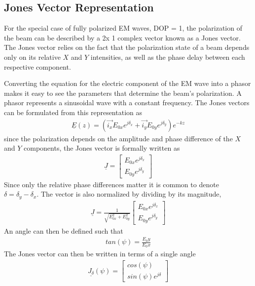 \subsection{Jones Vector Representation}
For the special case of fully polarized EM waves, DOP = 1, the polarization of the beam can be described by a 2x 1 complex vector known as a Jones vector.  The Jones vector relies on the fact that the polarization state of a beam depends only on its relative $X$ and $Y$ intensities, as well as the phase delay between each respective component.

Converting the equation for the electric component of the EM wave into a phasor makes it easy to see the parameters that determine the beam's polarization.  A phasor represents a sinusoidal wave with a constant frequency.  The Jones vectors can be formulated from this representation as
%
\begin{align}
    \underline{\hat{E}}(z)=(\vec{i_x} E_{0x} e^{j\delta_x}+\vec{i_y} E_{0y} e^{j\delta_y })e^{-kz}
\end{align}
%
since the polarization depends on the amplitude and phase difference of the $X$ and $Y$ components, the Jones vector is formally written as
%
\begin{align}
    \underline{J} =
    \begin{bmatrix}
        E_{0x} e^{j\delta_x} \\
        E_{0y} e^{j\delta_y }
    \end{bmatrix}
\end{align}
%
Since only the relative phase differences matter it is common to denote $\delta=\delta_y-\delta_x$.  The vector is also normalized by dividing by its magnitude,
%
\begin{align}
    \underline{J} =
    \frac{1}{\sqrt{E_{0x}^2 + E_{0y}^2}}
    \begin{bmatrix}
        E_{0x} e^{j\delta_x} \\
        E_{0y} e^{j\delta_y }
    \end{bmatrix}
\end{align}
%
An angle can then be defined such that
%
\begin{align}
    tan(\psi) = \frac{E_0y}{E_0x}
\end{align}
%
The Jones vector can then be written in terms of a single angle
%
\begin{align}
    \underline{J_{\delta}}(\psi) =
    \begin{bmatrix}
        cos(\psi) \\
        sin(\psi)e^{j\delta}
    \end{bmatrix}
\end{align}

